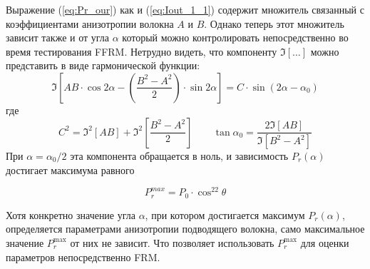 \documentclass{article}
\begin{document}
Выражение (\ref{eq:Pr_our}) как и (\ref{eq:Iout_1_1}) содержит множитель связанный с коэффициентами анизотропии волокна $A$ и $B$. Однако теперь этот множитель зависит также и от угла $\alpha$ который можно контролировать непосредственно во время тестирования FFRM. Нетрудно видеть, что компоненту $\Im[\ldots]$ можно представить в виде гармонической функции:
\begin{equation}
    \Im\left[A B\cdot \cos2\alpha -\left( \frac{B^2-A^2}{2} \right)\cdot\sin2\alpha\right] = C\cdot\sin(2\alpha-\alpha_0)
\end{equation}
где
\begin{equation}
    C^2=\Im^2[AB]+\Im^2\left[\frac{B^2-A^2}{2}\right] \qquad \tan\alpha_0=\frac{2\Im[AB]}{\Im[B^2-A^2]}
\end{equation}
При $\alpha=\alpha_0/2$ эта компонента обращается в ноль, и зависимость $P_r(\alpha)$ достигает максимума равного

\begin{equation}
    \label{eq:P_r_max}
    P_r^{max}=P_0\cdot\cos^22\theta
\end{equation} 

Хотя конкретно значение угла $\alpha$, при котором достигается максимум $P_r(\alpha)$, определяется параметрами анизотропии подводящего волокна, само максимальное значение $P_r^{\max}$ от них не зависит.
Что позволяет использовать $P_r^{\max}$ для оценки параметров непосредственно FRM.
\end{document}
